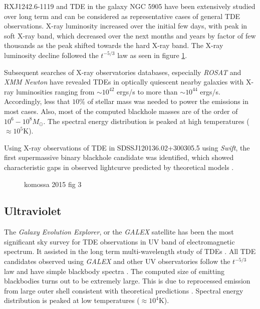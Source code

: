 \documentclass{tda}
\begin{document}
RXJ1242.6-1119 and TDE in the galaxy NGC 5905 have been extensively studied over long term and can be considered as representative cases of general TDE observations. X-ray luminosity increased over the initial few days, with peak in soft X-ray band, which decreased over the next months and years by factor of few thousands as the peak shifted towards the hard X-ray band. The X-ray luminosity decline followed the \(t^{-5/3}\) law \cite{komossa_tidal_2015} as seen in figure \ref{fig:xray_luminosity}.

Subsequent searches of X-ray observatories databases, especially \textit{ROSAT} and \textit{XMM Newton} have revealed TDEs in optically quiescent nearby galaxies \cite[see references in][]{komossa_tidal_2015} with X-ray luminosities ranging from \(\sim 10^{42}\) ergs/s to more than \(\sim 10^{44}\) ergs/s. Accordingly, less that \(10\%\) of stellar mass was needed to power the emissions in most cases. Also, most of the computed blackhole masses are of the order of \(10^6 - 10^8 M_{\odot}\). The spectral energy distribution is peaked at high temperatures (\(\approx 10^5\)K).

Using X-ray observations of TDE in SDSSJ120136.02+300305.5 using \textit{Swift}, the first supermassive binary blackhole candidate was identified, which showed characteristic gaps in observed lightcurve predicted by theoretical models \cite{liu_miliparsec_2014}.

\begin{figure}
	\caption{komossa 2015 fig 3}
	\label{fig:xray_luminosity}
\end{figure}

\subsection{Ultraviolet}

The \textit{Galaxy Evolution Explorer}, or the \textit{GALEX} satellite has been the most significant sky survey for TDE observations in UV band of electromagnetic spectrum. It assisted in the long term multi-wavelength study of TDEs \cite{gezari_ultraviolet_2006}. All TDE candidates observed using \textit{GALEX} and other UV observatories follow the \(t^{-5/3}\) law and have simple blackbody spectra \cite{nicholas_chamberlain_stone_tidal_2013}. The computed size of emitting blackbodies turns out to be extremely large. This is due to reprocessed emission from large outer shell consistent with theoretical predictions \cite{ulmer_flares_1999}. Spectral energy distribution is peaked at low temperatures (\(\approx 10^4\)K).
\end{document}
